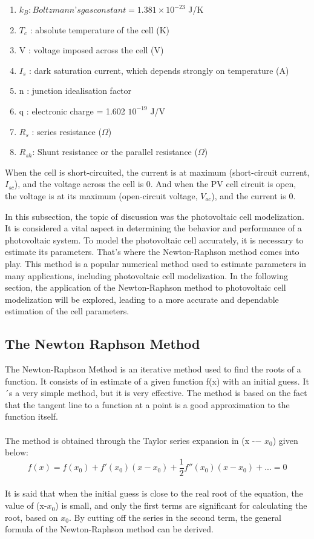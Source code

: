 \documentclass{report}
\begin{document}
\begin{enumerate}

    \item $k_{B} : Boltzmann’s gas constant = 1.381 \times 10^{-23}$  J/K
    \item $T_{c}$ : absolute temperature of the cell (K)
    \item V  : voltage imposed across the cell (V)
    \item $I_{s}$ : dark saturation current, which depends strongly on temperature (A)
    \item n : junction idealisation factor
    \item q : electronic charge = 1.602 \times $10^{-19}$ J/V
    \item $R_{s}$ : series resistance ($\Omega$)
    \item $R_{sh}$: Shunt resistance or the parallel resistance ($\Omega$)
\end{enumerate}

\hfill \break
When the cell is short-circuited, the current is at maximum (short-circuit current, $I_{sc}$), and the voltage across the cell is 0.
\hfill \break
And when the PV cell circuit is open,  the voltage is at its maximum (open-circuit voltage, $V_{oc}$), and the current is 0.

\hfill \break
In this subsection, the topic of discussion was the photovoltaic cell modelization. It is considered a vital aspect in determining the behavior and performance of a photovoltaic system. To model the photovoltaic cell accurately, it is necessary to estimate its parameters. That's where the Newton-Raphson method comes into play. This method is a popular numerical method used to estimate parameters in many applications, including photovoltaic cell modelization. In the following section, the application of the Newton-Raphson method to photovoltaic cell modelization will be explored, leading to a more accurate and dependable estimation of the cell parameters.
\subsection{The Newton Raphson Method }
The Newton-Raphson Method is an iterative method used to find the roots of a function. It consists of in estimate of a given function f(x) with an initial guess. It´s a very simple method, but it is very effective. The method is based on the fact that the tangent line to a function at a point is a good approximation to the function itself\cite{NRM}.\\
\\
The method is obtained through the Taylor series
expansion in (x -− $x_{0}$) given below:\\
\begin{equation}
f(x) = f(x_{0}) + f'(x_{0})(x-x_{0})  + \frac{1}{2} f''(x_{0})(x-x_{0}) + ... = 0
\end{equation}
\\
It is said that when the initial guess is close to the real root of the equation, the value of (x-$x_{0}$) is small, and only the first terms are significant for calculating the root, based on $x_{0}$. By cutting off the series in the second term, the general formula of the Newton-Raphson method can be derived\cite{nr2}.
\end{document}
